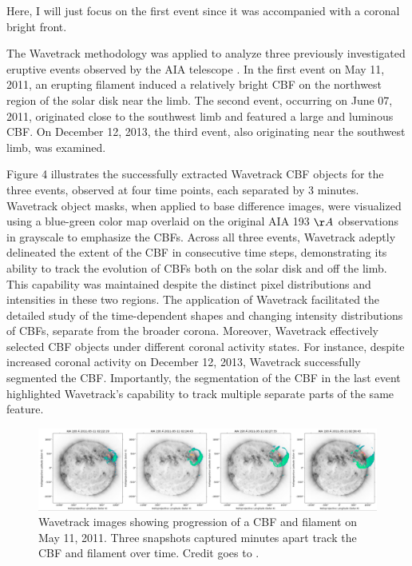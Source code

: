 Here, I will just focus on the first event since it was accompanied with a coronal bright front.

The Wavetrack methodology was applied to analyze three previously investigated eruptive events observed by the AIA telescope \citep{kozarev_2015, kozarev_2017}. In the first event on May 11, 2011, an erupting filament induced a relatively bright CBF on the northwest region of the solar disk near the limb. The second event, occurring on June 07, 2011, originated close to the southwest limb and featured a large and luminous CBF. On December 12, 2013, the third event, also originating near the southwest limb, was examined.

Figure 4 illustrates the successfully extracted Wavetrack CBF objects for the three events, observed at four time points, each separated by 3 minutes. Wavetrack object masks, when applied to base difference images, were visualized using a blue-green color map overlaid on the original AIA 193 $\AA$ observations in grayscale to emphasize the CBFs. Across all three events, Wavetrack adeptly delineated the extent of the CBF in consecutive time steps, demonstrating its ability to track the evolution of CBFs both on the solar disk and off the limb. This capability was maintained despite the distinct pixel distributions and intensities in these two regions. The application of Wavetrack facilitated the detailed study of the time-dependent shapes and changing intensity distributions of CBFs, separate from the broader corona. Moreover, Wavetrack effectively selected CBF objects under different coronal activity states. For instance, despite increased coronal activity on December 12, 2013, Wavetrack successfully segmented the CBF. Importantly, the segmentation of the CBF in the last event highlighted Wavetrack's capability to track multiple separate parts of the same feature.

\begin{figure}[!htp]
	\centering
	\includegraphics[width=0.9\hsize]{chapter2/figs/fig_1105011_wave_filament_fourpanel_plot.png}
	\caption{Wavetrack images showing progression of a CBF and filament on May 11, 2011. Three snapshots captured  minutes apart track the CBF and filament over time. Credit goes to \citet{stepanyuk_2022}.}
	\label{fig_wavetrack_cbf_filament}
\end{figure}

